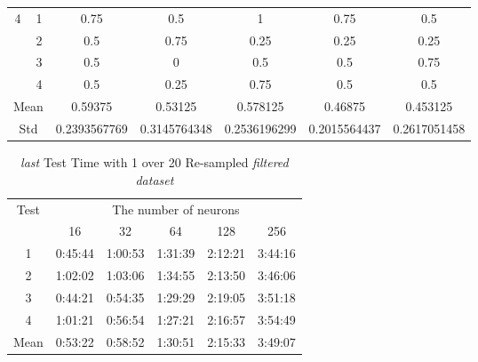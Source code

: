 \documentclass[draft,dvipsnames]{drexel-thesis}
\begin{document}
\begin{thesis}
\begin{table}[!t]
\begin{tabular}{|c|c|c|c|c|c|c|}
\multirow{4}{*}{4}    & 1                   & 0.75         & 0.5          & 1            & 0.75         & 0.5          \\ \cline{2-7}
                      & 2                   & 0.5          & 0.75         & 0.25         & 0.25         & 0.25         \\ \cline{2-7}
                      & 3                   & 0.5          & 0            & 0.5          & 0.5          & 0.75         \\ \cline{2-7}
                      & 4                   & 0.5          & 0.25         & 0.75         & 0.5          & 0.5          \\ \hline
\multicolumn{2}{|c|}{Mean}                  & 0.59375      & 0.53125      & 0.578125     & 0.46875      & 0.453125     \\ \hline
\multicolumn{2}{|c|}{Std}                   & 0.2393567769 & 0.3145764348 & 0.2536196299 & 0.2015564437 & 0.2617051458 \\ \hline
\end{tabular}
\end{table}

\begin{table}[!t]
\centering
\caption{{\em last} Test Time with 1 over 20 Re-sampled {\em filtered dataset}}
\label{tbl:last_1_20_time}
\begin{tabular}{|c|c|c|c|c|c|}
\hline
\multirow{2}{*}{Test}      & \multicolumn{5}{c|}{The number of neurons}                                                                                                               \\ \cline{2-6}
                           & 16                           & 32                           & 64                           & 128                          & 256                          \\ \hline
1                          & 0:45:44                      & 1:00:53                      & 1:31:39                      & 2:12:21                      & 3:44:16                      \\ \hline
2                          & 1:02:02                      & 1:03:06                      & 1:34:55                      & 2:13:50                      & 3:46:06                      \\ \hline
3                          & 0:44:21                      & 0:54:35                      & 1:29:29                      & 2:19:05                      & 3:51:18                      \\ \hline
4                          & 1:01:21                      & 0:56:54                      & 1:27:21                      & 2:16:57                      & 3:54:49                      \\ \hline
\multicolumn{1}{|l|}{Mean} & \multicolumn{1}{l|}{0:53:22} & \multicolumn{1}{l|}{0:58:52} & \multicolumn{1}{l|}{1:30:51} & \multicolumn{1}{l|}{2:15:33} & \multicolumn{1}{l|}{3:49:07} \\ \hline
\end{tabular}
\end{table}


\end{thesis}
\end{document}
